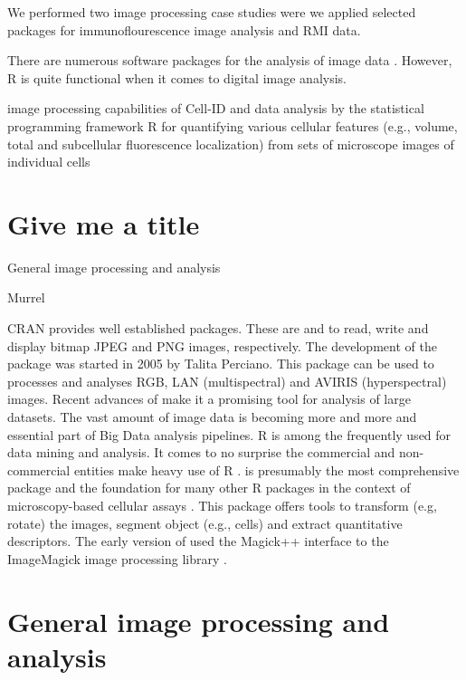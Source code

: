 We performed two image processing case studies were we applied selected 
packages for immunoflourescence image analysis and RMI data. 

There are numerous software packages for the analysis of image data 
\citep{wiesmann_review_2015}. However, R is quite functional when it comes to 
digital image analysis.

image processing capabilities of Cell-ID and data analysis by the statistical 
programming framework R for quantifying various cellular features (e.g., volume, 
total and subcellular fluorescence localization) from sets of microscope 
images of individual cells \citep{bush_using_2012}


\section{Give me a title}

General image processing and analysis


\citep{tabelow_modeling_2012, tabelow_dti:_2014}

Murrel \citep{murrell_raster_2011}
 \citep{clayden_mmand:_2016}

CRAN provides well established packages. These are  
\citep{urbanek_jpeg:_2014} and  \citep{urbanek_png:_2013} to 
read, write and display bitmap JPEG and PNG images, respectively. The 
development of the  \citep{perciano_ripa:_2014} package was started in 2005 by Talita Perciano. 
This package can be used to processes and analyses RGB, LAN (multispectral) 
and AVIRIS (hyperspectral) images. Recent advances of  make it a promising 
tool for analysis of large datasets. The vast amount of image data is becoming 
more and more and essential part of Big Data analysis pipelines. R is among 
the frequently used for data mining and analysis. It comes to no surprise the 
commercial and non-commercial entities make heavy use of R \citep{chen_big_2014}.  \citep{pau_ebimager_2010} 
is presumably the most comprehensive package and the foundation for many other 
R packages in the context of microscopy-based cellular assays \citep{gowen_near_2015}. This 
package offers tools to transform (e.g, rotate) the images, segment object 
(e.g., cells) and extract quantitative descriptors. The early version of 
 used the Magick++ interface to the ImageMagick image processing 
library \citep{sklyar_image_2006}.

\section{General image processing and analysis}

